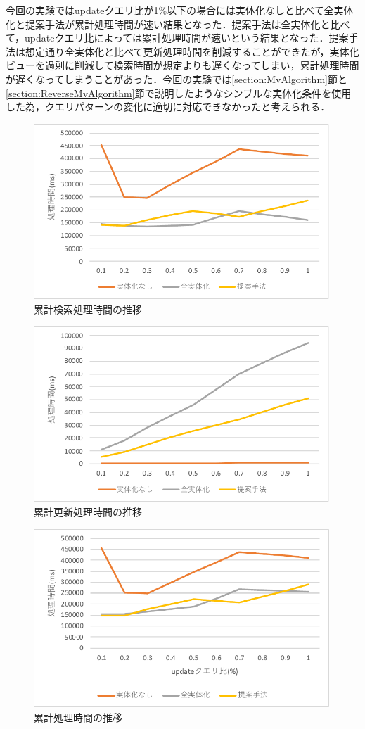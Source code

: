 \documentclass[a4paper,11pt]{ujreport}
\begin{document}
今回の実験ではupdateクエリ比が1\%以下の場合には実体化なしと比べて全実体化と提案手法が累計処理時間が速い結果となった．提案手法は全実体化と比べて，updateクエリ比によっては累計処理時間が速いという結果となった．提案手法は想定通り全実体化と比べて更新処理時間を削減することができたが，実体化ビューを過剰に削減して検索時間が想定よりも遅くなってしまい，累計処理時間が遅くなってしまうことがあった．今回の実験では\ref{section:MvAlgorithm}節と\ref{section:ReverseMvAlgorithm}節で説明したようなシンプルな実体化条件を使用した為，クエリパターンの変化に適切に対応できなかったと考えられる．
\begin{figure}[htbp]
	\begin{center}
		\includegraphics[width=30em]{src/Experiment-find.pdf} %
	\end{center}
	\caption{累計検索処理時間の推移}
	\label{figure:Experiment-find}
\end{figure}
\begin{figure}[htbp]
	\begin{center}
		\includegraphics[width=30em]{src/Experiment-update.pdf} %
	\end{center}
	\caption{累計更新処理時間の推移}
	\label{figure:Experiment-update}
\end{figure}
\begin{figure}[htbp]
	\begin{center}
		\includegraphics[width=30em]{src/Experiment-total.pdf} %
	\end{center}
	\caption{累計処理時間の推移}
	\label{figure:Experiment-total}
\end{figure}
\end{document}
